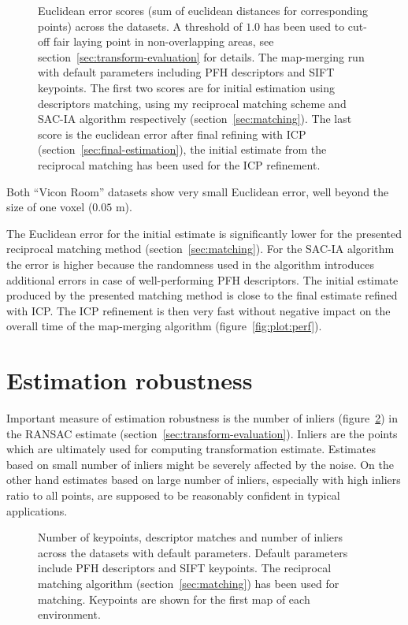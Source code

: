 \begin{figure}
  \centering
  
  \caption[Euclidean error scores for aerial datasets]{Euclidean error scores (sum of euclidean distances for corresponding points) across the datasets. A threshold of $1.0$ has been used to cut-off fair laying point in non-overlapping areas, see section~\ref{sec:transform-evaluation} for details. The map-merging run with default parameters including \gls{PFH} descriptors and \gls{SIFT} keypoints. The first two scores are for initial estimation using descriptors matching, using my reciprocal matching scheme and \gls{SAC-IA} algorithm respectively (section~\ref{sec:matching}). The last score is the euclidean error after final refining with \gls{ICP} (section~\ref{sec:final-estimation}), the initial estimate from the reciprocal matching has been used for the \gls{ICP} refinement.}
  \label{fig:plot:euc_dist}
\end{figure}

Both ``Vicon Room'' datasets show very small Euclidean error, well beyond the size of one voxel ($0.05$ m).

The Euclidean error for the initial estimate is significantly lower for the presented reciprocal matching method (section~\ref{sec:matching}). For the \gls{SAC-IA} algorithm the error is higher because the randomness used in the algorithm introduces additional errors in case of well-performing \gls{PFH} descriptors. The initial estimate produced by the presented matching method is close to the final estimate refined with \gls{ICP}. The \gls{ICP} refinement is then very fast without negative impact on the overall time of the map-merging algorithm (figure~\ref{fig:plot:perf}).

\section{Estimation robustness}

Important measure of estimation robustness is the number of inliers (figure~\ref{fig:plot:inliers}) in the \gls{RANSAC} estimate (section~\ref{sec:transform-evaluation}). Inliers are the points which are ultimately used for computing transformation estimate. Estimates based on small number of inliers might be severely affected by the noise. On the other hand estimates based on large number of inliers, especially with high inliers ratio to all points, are supposed to be reasonably confident in typical applications.

\begin{figure}
  \centering
  
  \caption[Number of keypoints, matches and inliers for aerial datasets]{Number of keypoints, descriptor matches and number of inliers across the datasets with default parameters. Default parameters include \gls{PFH} descriptors and \gls{SIFT} keypoints. The reciprocal matching algorithm (section~\ref{sec:matching}) has been used for matching. Keypoints are shown for the first map of each environment.}
  \label{fig:plot:inliers}
\end{figure}

